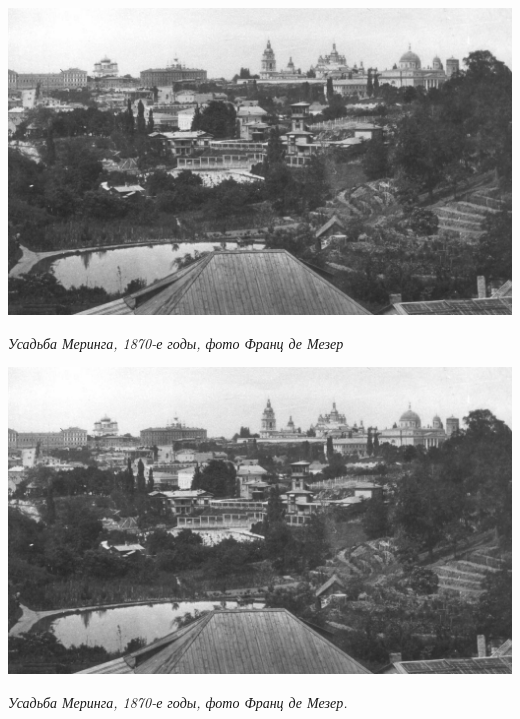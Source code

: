 \begin{center}
\includegraphics[width=\linewidth]{rpix/meringa_usadba.jpg}

\textit{Усадьба Меринга, 1870-е годы, фото Франц де Мезер}
\end{center}


\begin{center}
\includegraphics[width=\linewidth]{rpix/meringa_usadba.jpg}

\textit{Усадьба Меринга, 1870-е годы, фото Франц де Мезер.}
\end{center}


